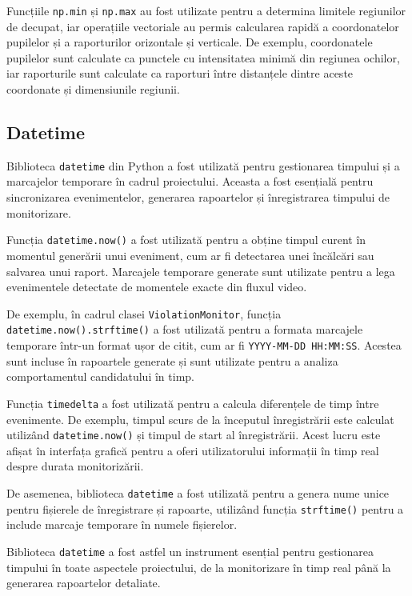 \documentclass[12pt,a4paper]{article}
\begin{document}
Funcțiile \texttt{np.min} și \texttt{np.max} au fost utilizate pentru a determina limitele regiunilor de decupat, iar operațiile vectoriale au permis calcularea rapidă a coordonatelor pupilelor și a raporturilor orizontale și verticale. De exemplu, coordonatele pupilelor sunt calculate ca punctele cu intensitatea minimă din regiunea ochilor, iar raporturile sunt calculate ca raporturi între distanțele dintre aceste coordonate și dimensiunile regiunii.

\subsection{Datetime}
Biblioteca \texttt{datetime}\cite{pythondatetime} din Python a fost utilizată pentru gestionarea timpului și a marcajelor temporare în cadrul proiectului. Aceasta a fost esențială pentru sincronizarea evenimentelor, generarea rapoartelor și înregistrarea timpului de monitorizare.

Funcția \texttt{datetime.now()} a fost utilizată pentru a obține timpul curent în momentul generării unui eveniment, cum ar fi detectarea unei încălcări sau salvarea unui raport. Marcajele temporare generate sunt utilizate pentru a lega evenimentele detectate de momentele exacte din fluxul video.

De exemplu, în cadrul clasei \texttt{ViolationMonitor}, funcția \texttt{datetime.now().strftime()} a fost utilizată pentru a formata marcajele temporare într-un format ușor de citit, cum ar fi \texttt{YYYY-MM-DD HH:MM:SS}. Acestea sunt incluse în rapoartele generate și sunt utilizate pentru a analiza comportamentul candidatului în timp.

Funcția \texttt{timedelta} a fost utilizată pentru a calcula diferențele de timp între evenimente. De exemplu, timpul scurs de la începutul înregistrării este calculat utilizând \texttt{datetime.now()} și timpul de start al înregistrării. Acest lucru este afișat în interfața grafică pentru a oferi utilizatorului informații în timp real despre durata monitorizării.

De asemenea, biblioteca \texttt{datetime} a fost utilizată pentru a genera nume unice pentru fișierele de înregistrare și rapoarte, utilizând funcția \texttt{strftime()} pentru a include marcaje temporare în numele fișierelor.

Biblioteca \texttt{datetime} a fost astfel un instrument esențial pentru gestionarea timpului în toate aspectele proiectului, de la monitorizare în timp real până la generarea rapoartelor detaliate.
\end{document}
